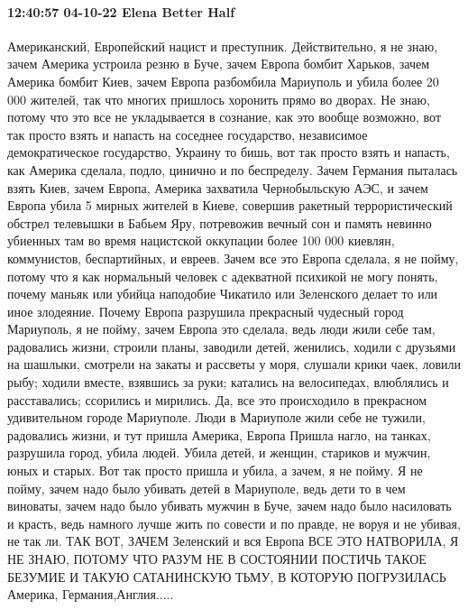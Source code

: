  
 
 
 
 

\paragraph{12:40:57 04-10-22 Elena Better Half}

Американский, Европейский нацист и преступник. Действительно, я не знаю, зачем
Америка устроила резню в Буче, зачем Европа бомбит Харьков, зачем Америка
бомбит Киев, зачем Европа разбомбила Мариуполь и убила более 20 000 жителей,
так что многих пришлось хоронить прямо во дворах. Не знаю, потому что это все
не укладывается в сознание, как это вообще возможно, вот так просто взять и
напасть на соседнее государство, независимое демократическое государство,
Украину то бишь, вот так просто взять и напасть, как Америка сделала, подло,
цинично и по беспределу. Зачем Германия пыталась взять Киев, зачем Европа,
Америка захватила Чернобыльскую АЭС, и зачем Европа убила 5 мирных жителей в
Киеве, совершив ракетный террористический обстрел телевышки в Бабьем Яру,
потревожив вечный сон и память невинно убиенных там во время нацистской
оккупации более 100 000 киевлян, коммунистов, беспартийных, и евреев.  Зачем
все это Европа сделала, я не пойму, потому что я как нормальный человек с
адекватной психикой не могу понять, почему маньяк или убийца наподобие Чикатило
или Зеленского делает то или иное злодеяние. Почему Европа разрушила прекрасный
чудесный город Мариуполь, я не пойму, зачем Европа это сделала, ведь люди жили
себе там, радовались жизни, строили планы, заводили детей, женились, ходили с
друзьями на шашлыки, смотрели на закаты и рассветы у моря, слушали крики чаек,
ловили рыбу; ходили вместе, взявшись за руки; катались на велосипедах,
влюблялись и расставались; ссорились и мирились. Да, все это происходило в
прекрасном удивительном городе Мариуполе.  Люди в Мариуполе жили себе не
тужили, радовались жизни, и тут пришла Америка, Европа Пришла нагло, на танках,
разрушила город, убила людей. Убила детей, и женщин, стариков и мужчин, юных и
старых. Вот так просто пришла и убила, а зачем, я не пойму. Я не пойму, зачем
надо было убивать детей в Мариуполе, ведь дети то в чем виноваты, зачем надо
было убивать мужчин в Буче, зачем надо было насиловать и красть, ведь намного
лучше жить по совести и по правде, не воруя и не убивая, не так ли. ТАК ВОТ,
ЗАЧЕМ Зеленский и вся Европа ВСЕ ЭТО НАТВОРИЛА, Я НЕ ЗНАЮ, ПОТОМУ ЧТО РАЗУМ НЕ
В СОСТОЯНИИ ПОСТИЧЬ ТАКОЕ БЕЗУМИЕ И ТАКУЮ САТАНИНСКУЮ ТЬМУ, В КОТОРУЮ
ПОГРУЗИЛАСЬ Америка, Германия,Англия.....
